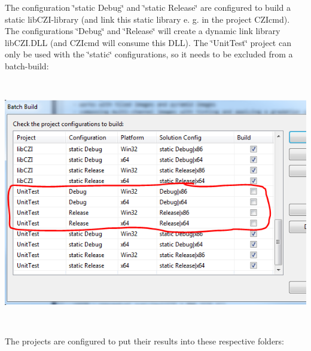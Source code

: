 The configuration \char`\"{}static Debug\char`\"{} and \char`\"{}static Release\char`\"{} are configured to build a static lib\+C\+Z\+I-\/library (and link this static library e. g. in the project C\+Z\+Icmd). The configurations \char`\"{}\+Debug\char`\"{} and \char`\"{}\+Release\char`\"{} will create a dynamic link library lib\+C\+Z\+I.\+D\+LL (and C\+Z\+Icmd will consume this D\+LL). The \char`\"{}\+Unit\+Test\char`\"{} project can only be used with the \char`\"{}static\char`\"{} configurations, so it needs to be excluded from a batch-\/build\+:


\begin{DoxyImage}
\includegraphics[height=10.8cm]{VisualStudioProj_3.PNG}
\end{DoxyImage}


The projects are configured to put their results into these respective folders\+:


